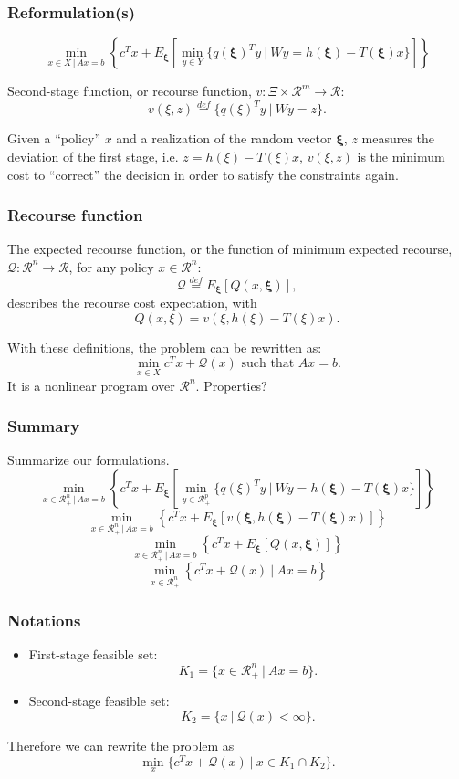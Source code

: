 \documentclass{beamer}
\def\bxi{\boldsymbol\xi}
\def\bxi{\boldsymbol\xi}
\def\rit{\mathcal{R}}
\begin{document}
\begin{frame}
\frametitle{Reformulation(s)}

\[
\min_{x \in X \,|\, Ax = b} \left\lbrace c^Tx + E_{\bxi} \left[ \min_{y \in Y} \lbrace q(\bxi)^Ty \ |\ Wy = h(\bxi) - T(\bxi)x \rbrace \right] \right\rbrace 
\]

\mbox{}

{\red Second-stage function}, or {\red recourse function}, $v: \Xi \times \rit^m \rightarrow \rit$:
\[
v(\xi, z) \overset{def}{=} \lbrace q(\xi)^Ty \ |\ Wy = z \rbrace.
\]

Given a ``policy'' $x$ and a realization of the random vector $\bxi$, $z$ measures the deviation of the first stage, i.e. $z = h(\xi) - T(\xi)x$, $v(\xi, z)$ is the minimum cost to ``correct'' the decision in order to satisfy the constraints again.

\end{frame}

\begin{frame}
\frametitle{Recourse function}

The {\red expected recourse function}, or the function of minimum expected recourse, $\mathcal{Q}: \rit^n \rightarrow \rit$, for any policy $x \in \rit^n$:
\[
\mathcal{Q} \overset{def}{=} E_{\bxi}[Q(x,\bxi)],
\]
describes the recourse cost expectation, with
\[
Q(x, \xi) = v(\xi, h(\xi)-T(\xi)x).
\]

\mbox{}

With these definitions, the problem can be rewritten as:
\[
\min_{x \in X} c^Tx + \mathcal{Q}(x) \mbox{ such that } Ax = b.
\]
It is a nonlinear program over $\rit^n$. Properties?
\end{frame}

\begin{frame}
\frametitle{Summary}

Summarize our formulations.
\[
\min_{x \in \rit^n_+ \,|\, Ax = b} \left\lbrace c^Tx + E_{\bxi} \left[ \min_{y \in \rit^p_+} \lbrace q(\xi)^Ty \ |\ Wy = h(\bxi) - T(\bxi)x \rbrace \right] \right\rbrace 
\]
\[
\min_{x \in \rit^n_+ \,|\, Ax = b} \left\lbrace c^Tx + E_{\bxi}
  \left[  v(\bxi, h(\bxi)-T(\bxi)x) \right] \right\rbrace 
\]
\[
\min_{x \in \rit^n_+ \,|\, Ax = b} \left\lbrace c^Tx + E_{\bxi} \left[ Q(x,\bxi) \right] \right\rbrace 
\]
\[
\min_{x \in \rit^n_+} \left\lbrace c^Tx + \mathcal{Q}(x)
  \ |\ Ax = b \right\rbrace 
\]

\end{frame}

\begin{frame}
\frametitle{Notations}

\begin{itemize}
\item
First-stage feasible set:
\[
K_1 = \lbrace x \in \rit^n_+ \ |\ Ax = b \rbrace.
\]
\item
Second-stage feasible set:
\[
K_2 = \lbrace x \ |\ \mathcal{Q}(x) < \infty \rbrace.
\]
\end{itemize}

\mbox{}

Therefore we can rewrite the problem as
\[
\min_x \lbrace c^Tx + \mathcal{Q}(x) \ |\ x \in K_1 \cap K_2 \rbrace.
\]

\end{frame}
\end{document}
